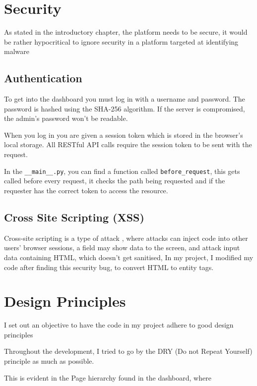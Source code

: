 \section{Security}
As stated in the introductory chapter, the platform needs to be secure,
it would be rather hypocritical to ignore security in a
platform targeted at identifying malware

\subsection{Authentication}
To get into the dashboard you must log in with a username and password.
The password is hashed using the SHA-256 algorithm.
If the server is compromised, the admin's password won't be readable.

When you log in you are given a session token which is stored in the browser's local storage.
All RESTful API calls require the session token to be sent with the request.

In the \texttt{\_\_main\_\_.py}, you can find a function
called \texttt{before\_request},
this gets called before every request, it checks the path being requested
and if the requester has the correct token to access the resource.

\subsection{Cross Site Scripting (XSS)}
Cross-site scripting is a type of attack \cite{XSS},
where attacks can inject code into other users' browser sessions,
a field may show data to the screen, and attack input data containing HTML,
which doesn't get sanitised, In my project, I modified my code
after finding this security bug, to convert HTML to entity tags. 

\section {Design Principles}
I set out an objective to have the code in my project
adhere to good design principles

Throughout the development, I tried to go by the DRY
(Do not Repeat Yourself) principle as much as possible.

This is evident in the Page hierarchy found in the dashboard,
where 

